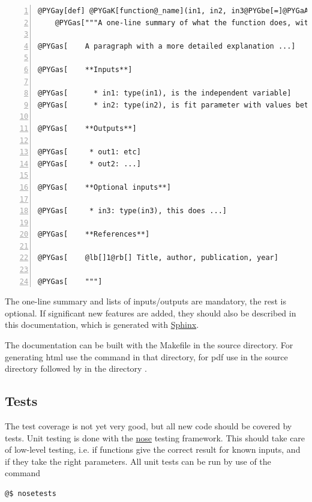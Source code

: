\documentclass[letterpaper,10pt,english]{manual}
\begin{document}
\begin{Verbatim}[commandchars=@\[\],numbers=left,firstnumber=1,stepnumber=1]
@PYGay[def] @PYGaK[function@_name](in1, in2, in3@PYGbe[=]@PYGaA[None]):
    @PYGas["""A one-line summary of what the function does, without func name in it]

@PYGas[    A paragraph with a more detailed explanation ...]

@PYGas[    **Inputs**]

@PYGas[      * in1: type(in1), is the independent variable]
@PYGas[      * in2: type(in2), is fit parameter with values between a and b]

@PYGas[    **Outputs**]

@PYGas[     * out1: etc]
@PYGas[     * out2: ...]

@PYGas[    **Optional inputs**]

@PYGas[     * in3: type(in3), this does ...]

@PYGas[    **References**]

@PYGas[    @lb[]1@rb[] Title, author, publication, year]

@PYGas[    """]
\end{Verbatim}

The one-line summary and lists of inputs/outputs are mandatory, the rest is optional. If significant new features are added, they should also be described in this documentation, which is generated with \href{http://sphinx.pocoo.org}{Sphinx}.

The documentation can be built with the Makefile in the source directory. For generating html use the command  in that directory, for pdf use  in the source directory followed by  in the directory .


\subsection{Tests}

The test coverage is not yet very good, but all new code should be covered by tests. Unit testing is done with the \href{http://somethingaboutorange.com/mrl/projects/nose/}{nose} testing framework. This should take care of low-level testing, i.e. if functions give the correct result for known inputs, and if they take the right parameters. All unit tests can be run by use of the command

\begin{Verbatim}[commandchars=@\[\]]
@$ nosetests
\end{Verbatim}
\end{document}
